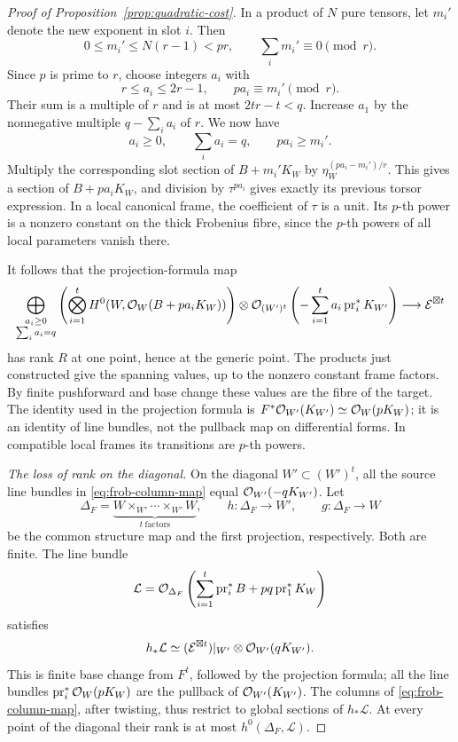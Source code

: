 \begin{proof}[Proof of Proposition~\ref{prop:quadratic-cost}]
In a product of $N$ pure tensors, let $m_i'$ denote the new exponent
in slot $i$.  Then
\[
 0\le m_i'\le N(r-1)<pr,
 \qquad \sum_i m_i'\equiv0\pmod r.
\]
Since $p$ is prime to $r$, choose integers $a_i$ with
\[
 r\le a_i\le2r-1,\qquad pa_i\equiv m_i'\pmod r.
\]
Their sum is a multiple of $r$ and is at most $2tr-t<q$.  Increase
$a_1$ by the nonnegative multiple $q-\sum_i a_i$ of $r$.  We now have
\begin{equation}\label{eq:frob-padded-weights}
 a_i\ge0,\qquad \sum_i a_i=q,\qquad pa_i\ge m_i'.
\end{equation}
Multiply the corresponding slot section of $B+m_i'K_W$ by
$\eta_W^{(pa_i-m_i')/r}$.  This gives a section of $B+pa_iK_W$, and
division by $\tau^{pa_i}$ gives exactly its previous torsor expression.
In a local canonical frame, the coefficient of $\tau$ is a unit.  Its
$p$-th power is a nonzero constant on the thick Frobenius fibre, since
the $p$-th powers of all local parameters vanish there.

It follows that the projection-formula map
\begin{equation}\label{eq:frob-column-map}
 \bigoplus_{\substack{a_i\ge0\\\sum_i a_i=q}}
 \left(\bigotimes_{i=1}^tH^0(W,\mathcal O_W(B+pa_iK_W))\right)
 \otimes
 \mathcal O_{(W')^t}\left(-\sum_{i=1}^t a_i\operatorname{pr}_i^*K_{W'}\right)
 \longrightarrow\mathcal E^{\boxtimes t}
\end{equation}
has rank $R$ at one point, hence at the generic point.  The products
just constructed give the spanning values, up to the nonzero constant
frame factors.  By finite pushforward and base change these values are
the fibre of the target.  The identity used in the projection formula
is $F^*\mathcal O_{W'}(K_{W'})\simeq\mathcal O_W(pK_W)$; it is an identity of line
bundles, not the pullback map on differential forms.  In compatible
local frames its transitions are $p$-th powers.

\emph{The loss of rank on the diagonal.}
On the diagonal $W'\subset(W')^t$, all the source line bundles in
\eqref{eq:frob-column-map} equal $\mathcal O_{W'}(-qK_{W'})$.  Let
\[
 \Delta_F=\underbrace{W\times_{W'}\cdots\times_{W'}W}_{t\ \mathrm{factors}},
 \qquad h:\Delta_F\to W',\qquad g:\Delta_F\to W
\]
be the common structure map and the first projection, respectively.
Both are finite.  The line bundle
\begin{equation}\label{eq:frob-diagonal-line}
 \mathcal L=\mathcal O_{\Delta_F}\left(
       \sum_{i=1}^t\operatorname{pr}_i^*B
       +pq\operatorname{pr}_1^*K_W\right)
\end{equation}
satisfies
\[
 h_*\mathcal L\simeq
 (\mathcal E^{\boxtimes t})|_{W'}\otimes\mathcal O_{W'}(qK_{W'}).
\]
This is finite base change from $F^t$, followed by the projection
formula; all the line bundles $\operatorname{pr}_i^*\mathcal O_W(pK_W)$
are the pullback of $\mathcal O_{W'}(K_{W'})$.  The columns of
\eqref{eq:frob-column-map}, after twisting, thus restrict to global
sections of $h_*\mathcal L$.  At every point of the diagonal their rank
is at most $h^0(\Delta_F,\mathcal L)$.


\end{proof}

